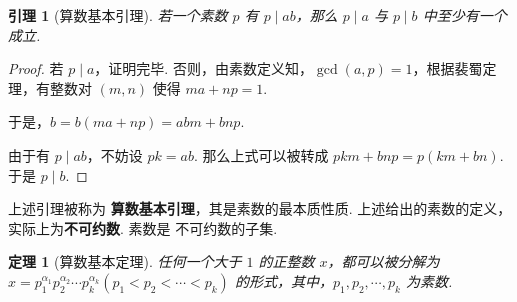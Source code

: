 \documentclass[a4paper]{article}
\newtheorem{theorem}{定理}[section]
\newtheorem{lemma}{引理}[section]
\begin{document}
\begin{lemma}[算数基本引理]
    若一个素数 $p$ 有 $p\mid ab$，那么 $p\mid a$ 与 $p\mid b$ 中至少有一个成立.
\end{lemma}

\begin{proof}
    若 $p\mid a$，证明完毕. 否则，由素数定义知，$\gcd(a,p)=1$，根据裴蜀定理，有整数对 $(m,n)$ 使得 $ma+np=1$.

    于是，$b=b(ma+np)=abm+bnp$.

    由于有 $p\mid ab$，不妨设 $pk=ab$. 那么上式可以被转成 $pkm+bnp=p(km+bn)$. 于是 $p\mid b$.
\end{proof}

上述引理被称为 \textbf{算数基本引理}，其是素数的最本质性质. 上述给出的素数的定义，实际上为\textbf{不可约数}. 素数是
不可约数的子集.

\begin{theorem}[算数基本定理]
    任何一个大于 $1$ 的正整数 $x$，都可以被分解为 $x=p_1^{\alpha_1}p_2^{\alpha_2}\cdots p_k^{\alpha_k}(p_1<
        p_2<\cdots<p_k)$ 的形式，其中，$p_1,p_2,\cdots,p_k$ 为素数.
\end{theorem}
\end{document}
